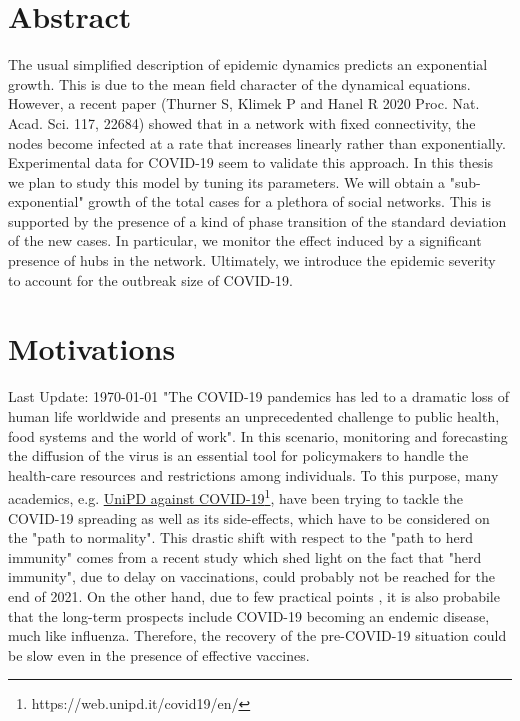 \documentclass[a4paper,10pt]{book} %
\theoremstyle{definition}
\begin{document}

\chapter*{Abstract}
The usual simplified description of epidemic dynamics predicts an exponential growth. This is due to the mean field character of the dynamical equations. However, a recent paper (Thurner S, Klimek P and Hanel R 2020 Proc. Nat. Acad. Sci. 117, 22684) \cite{Thurner::NetBasedExpl} showed that in a network with fixed connectivity, the nodes become infected at a rate that increases linearly rather than exponentially.
Experimental data for COVID-19 seem to validate this approach. In this thesis we plan to study this model by tuning its parameters. We will obtain a "sub-exponential" growth of the total cases for a plethora of social networks. This is supported by the presence of a kind of phase transition of the standard deviation of the new cases. In particular, we monitor the effect induced by a significant presence of hubs in the network.
Ultimately, we introduce the epidemic severity to account for the outbreak size of COVID-19.

\chapter*{Motivations}
Last Update: \today
"The COVID-19 pandemics has led to a dramatic loss of human life worldwide and presents an unprecedented challenge to public health, food systems and the world of work"\cite{Chriscaden::2021_ImpactCOVID19}. In this scenario, monitoring and forecasting the diffusion of the virus is an essential tool for policymakers to handle the health-care resources and restrictions among individuals. To this purpose, many academics, e.g. \href{https://web.unipd.it/covid19/en/}{UniPD against COVID-19}\footnote{https://web.unipd.it/covid19/en/}, have been trying to tackle the COVID-19 spreading as well as its side-effects, which have to be considered on the "path to normality". This drastic shift with respect to the "path to herd immunity" comes from a recent study \cite{GU::2021_SitePathToNormality} which shed light on the fact that "herd immunity", due to delay on vaccinations, could probably not be reached for the end of 2021. On the other hand, due to few practical points \cite{Nature:18.3.2021_NoHerdImmunity}, it is also probabile that the long-term prospects include COVID-19 becoming an endemic disease, much like influenza. 
Therefore, the recovery of the pre-COVID-19 situation could be slow even in the presence of effective vaccines.
\end{document}
